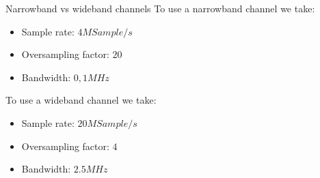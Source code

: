 \documentclass{beamer}
\begin{document}
\begin{frame}{Narrowband vs wideband channels}
    To use a narrowband channel we take:
        \begin{itemize}
        \item Sample rate: $4M Sample/s$
        \item Oversampling factor: $20$
        \item Bandwidth: $0,1 MHz$
        \end{itemize}
    To use a wideband channel we take:
        \begin{itemize}
        \item Sample rate: $20M Sample/s$
        \item Oversampling factor: $4$
        \item Bandwidth: $2.5 MHz$
        \end{itemize}
\end{frame}
\end{document}
